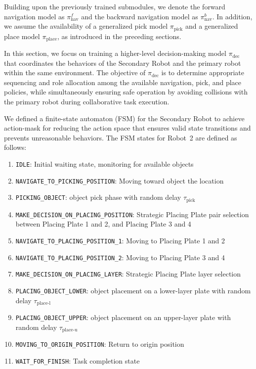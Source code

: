 \documentclass[english, 12pt, a4paper, elec, utf8, a-2b, online]{aaltothesis}
\begin{document}
Building upon the previously trained submodules, we denote the forward navigation model as $\pi_{\text{nav}}^{f}$ and the backward navigation model as $\pi_{\text{nav}}^{b}$. In addition, we assume the availability of a generalized pick model $\pi_{\text{pick}}$ and a generalized place model $\pi_{\text{place}}$, as introduced in the preceding sections.

In this section, we focus on training a higher-level decision-making model $\pi_{\text{dec}}$ that coordinates the behaviors of the Secondary Robot and the primary robot within the same environment. The objective of $\pi_{\text{dec}}$ is to determine appropriate sequencing and role allocation among the available navigation, pick, and place policies, while simultaneously ensuring safe operation by avoiding collisions with the primary robot during collaborative task execution.

We defined a finite-state automaton (FSM) for the Secondary Robot to achieve action-mask for reducing the action space that ensures valid state transitions and prevents unreasonable behaviors. The FSM states for Robot~2 are defined as follows:

\begin{enumerate}
    \item [S0] \texttt{IDLE}: Initial waiting state, monitoring for available objects
    \item [S1] \texttt{NAVIGATE\_TO\_PICKING\_POSITION}: Moving toward object the location
    \item [S2] \texttt{PICKING\_OBJECT}: object pick phase with random delay $\tau_\text{pick}$
    \item [S3] \texttt{MAKE\_DECISION\_ON\_PLACING\_POSITION}: Strategic Placing Plate pair selection between Placing Plate 1 and 2, and Placing Plate 3 and 4
    \item [S4] \texttt{NAVIGATE\_TO\_PLACING\_POSITION\_1}: Moving to Placing Plate 1 and 2
    \item [S5] \texttt{NAVIGATE\_TO\_PLACING\_POSITION\_2}: Moving to Placing Plate 3 and 4
    \item [S6] \texttt{MAKE\_DECISION\_ON\_PLACING\_LAYER}: Strategic Placing Plate layer selection
    \item [S7] \texttt{PLACING\_OBJECT\_LOWER}: object placement on a lower-layer plate with random delay $\tau_\text{place-l}$
    \item [S8] \texttt{PLACING\_OBJECT\_UPPER}: object placement on an upper-layer plate with random delay $\tau_\text{place-u}$
    \item [S9] \texttt{MOVING\_TO\_ORIGIN\_POSITION}: Return to origin position
    \item [S10] \texttt{WAIT\_FOR\_FINISH}: Task completion state
\end{enumerate}
\end{document}
